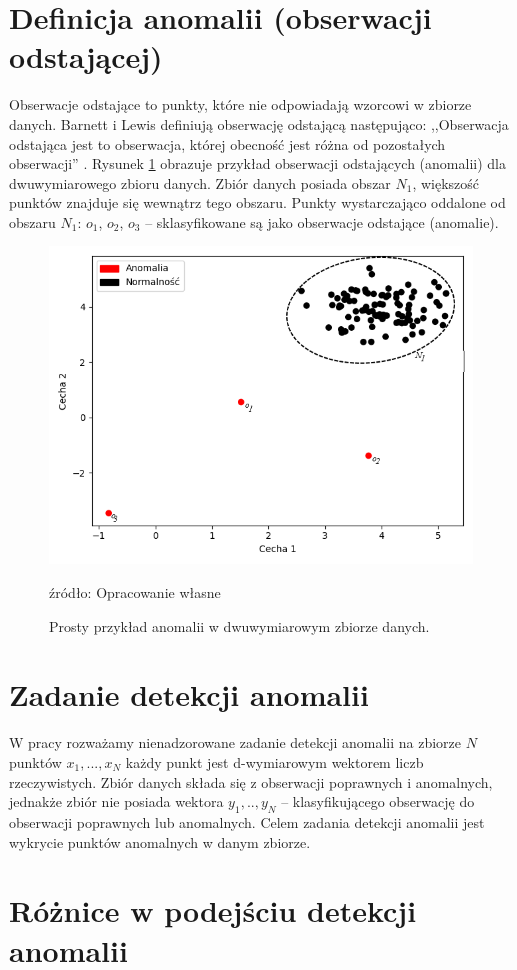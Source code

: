 \section{Definicja anomalii (obserwacji odstającej)}
Obserwacje odstające to punkty, które nie odpowiadają wzorcowi w zbiorze danych. Barnett i Lewis definiują obserwację odstającą następująco: ,,Obserwacja odstająca jest to obserwacja, której obecność jest różna od pozostałych obserwacji'' \cite{barnett1984outliers}. Rysunek \ref{fig:anomalia} obrazuje przykład obserwacji odstających (anomalii) dla dwuwymiarowego zbioru danych. Zbiór danych posiada obszar {$N_1$}, większość punktów znajduje się wewnątrz tego obszaru. Punkty wystarczająco oddalone od obszaru $N_1$: $o_1$, $o_2$, $o_3$ -- sklasyfikowane są jako obserwacje odstające (anomalie).
\begin{figure}[h]
    \centering
    \includegraphics[width=.7\textwidth]{chapters/istniejace/images/anomalia.png}
    \caption{Prosty przykład anomalii w dwuwymiarowym zbiorze danych.}
    \footnotesize{źródło: Opracowanie własne}
    \label{fig:anomalia}
\end{figure}

\section{Zadanie detekcji anomalii}
W pracy rozważamy nienadzorowane zadanie detekcji anomalii na zbiorze $N$ punktów $x_1,...,x_N$ każdy punkt jest d-wymiarowym wektorem liczb rzeczywistych. Zbiór danych składa się z obserwacji poprawnych i anomalnych, jednakże zbiór nie posiada wektora $y_1,..,y_N$ -- klasyfikującego obserwację do obserwacji poprawnych lub anomalnych. Celem zadania detekcji anomalii jest wykrycie punktów anomalnych w danym zbiorze.

\section{Różnice w podejściu detekcji anomalii}

